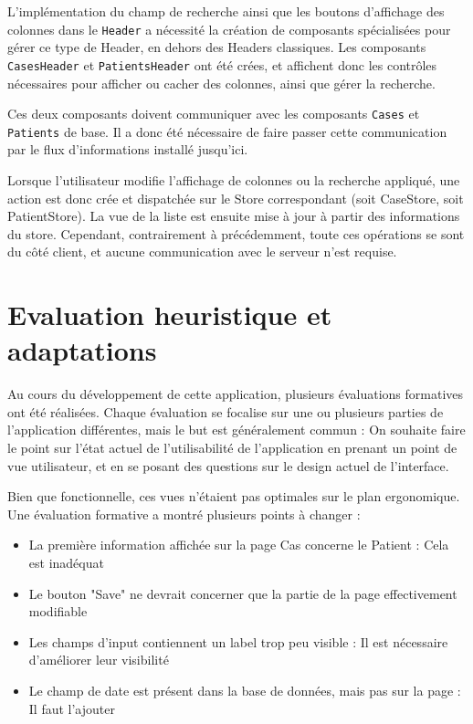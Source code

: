 		L'implémentation du champ de recherche ainsi que les boutons d'affichage des colonnes dans le \texttt{Header} a nécessité la création de composants spécialisées pour gérer ce type de Header, en dehors des Headers classiques. Les composants \texttt{CasesHeader} et \texttt{PatientsHeader} ont été crées, et affichent donc les contrôles nécessaires pour afficher ou cacher des colonnes, ainsi que gérer la recherche.

		Ces deux composants doivent communiquer avec les composants \texttt{Cases} et \texttt{Patients} de base. Il a donc été nécessaire de faire passer cette communication par le flux d'informations installé jusqu'ici.

		Lorsque l'utilisateur modifie l'affichage de colonnes ou la recherche appliqué, une action est donc crée et dispatchée sur le Store correspondant (soit CaseStore, soit PatientStore). La vue de la liste est ensuite mise à jour à partir des informations du store. Cependant, contrairement à précédemment, toute ces opérations se sont du côté client, et aucune communication avec le serveur n'est requise.

\section{Evaluation heuristique et adaptations}

	Au cours du développement de cette application, plusieurs évaluations formatives ont été réalisées. Chaque évaluation se focalise sur une ou plusieurs parties de l'application différentes, mais le but est généralement commun : On souhaite faire le point sur l'état actuel de l'utilisabilité de l'application en prenant un point de vue utilisateur, et en se posant des questions sur le design actuel de l'interface.

	Bien que fonctionnelle, ces vues n'étaient pas optimales sur le plan ergonomique. Une évaluation formative a montré plusieurs points à changer :
	\begin{itemize}
		\item La première information affichée sur la page Cas concerne le Patient : Cela est inadéquat
		\item Le bouton "Save" ne devrait concerner que la partie de la page effectivement modifiable
		\item Les champs d'input contiennent un label trop peu visible : Il est nécessaire d'améliorer leur visibilité
		\item Le champ de date est présent dans la base de données, mais pas sur la page : Il faut l'ajouter
	\end{itemize}

